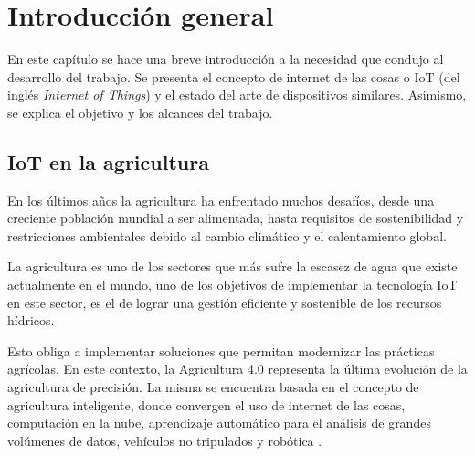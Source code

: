 
\chapter{Introducción general} %
En este capítulo se hace una breve introducción a la necesidad que condujo al desarrollo del trabajo. Se presenta el concepto de internet de las cosas o IoT (del inglés \textit{Internet of Things}) y el estado del arte de dispositivos similares. Asimismo, se explica el objetivo y los alcances del trabajo.
\label{Chapter1} %
\label{IntroGeneral}


\newcommand{\keyword}[1]{\textbf{#1}}
\newcommand{\tabhead}[1]{\textbf{#1}}
\newcommand{\code}[1]{\texttt{#1}}
\newcommand{\file}[1]{\texttt{\bfseries#1}}
\newcommand{\option}[1]{\texttt{\itshape#1}}
\newcommand{\grados}{$^{\circ}$}



\section{IoT en la agricultura}
En los últimos años la agricultura ha enfrentado muchos desafíos, desde una creciente población mundial a ser alimentada, hasta requisitos de sostenibilidad y restricciones ambientales debido al cambio climático y el calentamiento global.

La agricultura es uno de los sectores que más sufre la escasez de agua que existe actualmente en el mundo, uno de los objetivos de implementar la tecnología IoT en este sector, es el de lograr una gestión eficiente y sostenible de los recursos hídricos.

Esto obliga a implementar soluciones que permitan modernizar las prácticas agrícolas. En este contexto, la Agricultura 4.0 representa la última evolución de la  agricultura de precisión. La misma se encuentra basada en el concepto de agricultura inteligente, donde convergen el uso de internet de las cosas, computación
en la nube, aprendizaje automático para el análisis de grandes volúmenes de datos, vehículos no tripulados y robótica \citep{Agriculture4.0}.

